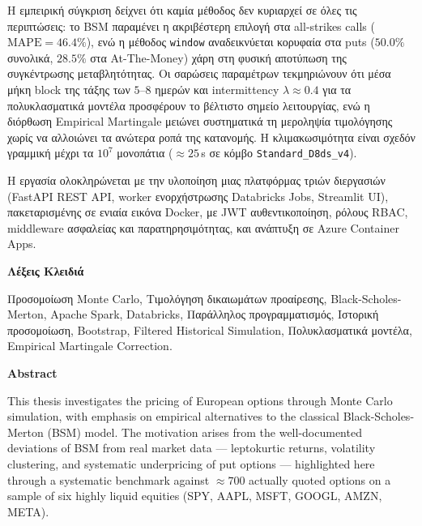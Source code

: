 \documentclass[12pt]{article}
\begin{document}
Η εμπειρική σύγκριση δείχνει ότι καμία μέθοδος δεν κυριαρχεί σε όλες τις περιπτώσεις: το BSM παραμένει η ακριβέστερη επιλογή στα all-strikes calls ($\mathrm{MAPE} = 46.4\%$), ενώ η μέθοδος \texttt{window} αναδεικνύεται κορυφαία στα puts ($50.0\%$ συνολικά, $28.5\%$ στα At-The-Money) χάρη στη φυσική αποτύπωση της συγκέντρωσης μεταβλητότητας. Οι σαρώσεις παραμέτρων τεκμηριώνουν ότι μέσα μήκη block της τάξης των $5$--$8$ ημερών και intermittency $\lambda \approx 0.4$ για τα πολυκλασματικά μοντέλα προσφέρουν το βέλτιστο σημείο λειτουργίας, ενώ η διόρθωση Empirical Martingale μειώνει συστηματικά τη μεροληψία τιμολόγησης χωρίς να αλλοιώνει τα ανώτερα ροπά της κατανομής. Η κλιμακωσιμότητα είναι σχεδόν γραμμική μέχρι τα $10^{7}$ μονοπάτια ($\approx 25\,$s σε κόμβο \texttt{Standard\_D8ds\_v4}).

Η εργασία ολοκληρώνεται με την υλοποίηση μιας πλατφόρμας τριών διεργασιών (FastAPI REST API, worker ενορχήστρωσης Databricks Jobs, Streamlit UI), πακεταρισμένης σε ενιαία εικόνα Docker, με JWT αυθεντικοποίηση, ρόλους RBAC, middleware ασφαλείας και παρατηρησιμότητας, και ανάπτυξη σε Azure Container Apps.

\vspace{2ex}
\begin{center}
\begin{large}\textbf{Λέξεις Κλειδιά}\end{large}
\end{center}

Προσομοίωση Monte Carlo, Τιμολόγηση δικαιωμάτων προαίρεσης, Black-Scholes-Merton, Apache Spark, Databricks, Παράλληλος προγραμματισμός, Ιστορική προσομοίωση, Bootstrap, Filtered Historical Simulation, Πολυκλασματικά μοντέλα, Empirical Martingale Correction.

\newpage

\begin{center}
\begin{large}\textbf{Abstract}\end{large}
\end{center}

This thesis investigates the pricing of European options through Monte Carlo simulation, with emphasis on empirical alternatives to the classical Black-Scholes-Merton (BSM) model. The motivation arises from the well-documented deviations of BSM from real market data --- leptokurtic returns, volatility clustering, and systematic underpricing of put options --- highlighted here through a systematic benchmark against $\approx 700$ actually quoted options on a sample of six highly liquid equities (SPY, AAPL, MSFT, GOOGL, AMZN, META).
\end{document}
